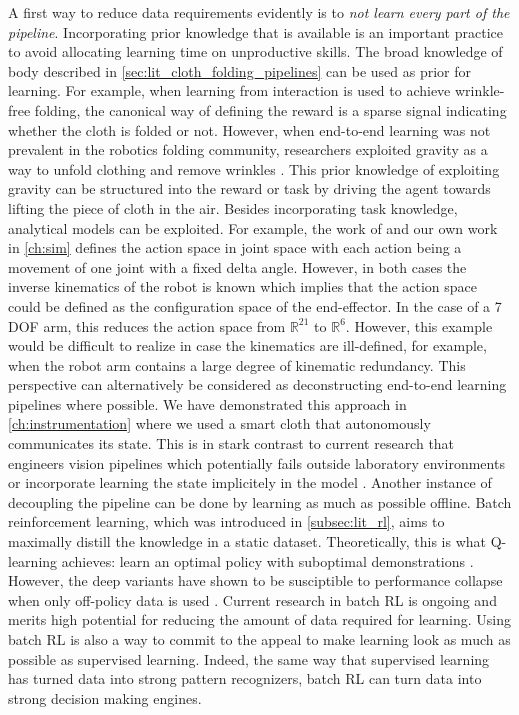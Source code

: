 \documentclass[\home/main.tex]{subfiles}
\begin{document}
A first way to reduce data requirements evidently is to \emph{not learn every part of the pipeline}. Incorporating prior knowledge that is available is an important practice to avoid allocating learning time on unproductive skills.
The broad knowledge of body described in \cref{sec:lit_cloth_folding_pipelines} can be used as prior for learning. For example, when learning from interaction is used to achieve wrinkle-free folding, the canonical way of defining the reward is a sparse signal indicating whether the cloth is folded or not. However, when end-to-end learning was not prevalent in the robotics folding community, researchers exploited gravity as a way to unfold clothing and remove wrinkles \autocite{Doumanoglou2016,Maitin2010}. This prior knowledge of exploiting gravity can be structured into the reward or task by driving the agent towards lifting the piece of cloth in the air.
Besides incorporating task knowledge, analytical models can be exploited. For example, the work of \textcite{Zhang2015} and our own work in \cref{ch:sim} defines the action space in joint space with each action being a movement of one joint with a fixed delta angle. However, in both cases the inverse kinematics of the robot is known which implies that the action space could be defined as the configuration space of the end-effector. In the case of a 7 \gls{DOF} arm, this reduces the action space from $\mathbb{R}^{21}$ to $\mathbb{R}^6$. However, this example would be difficult to realize in case the kinematics are ill-defined, for example, when the robot arm contains a large degree of kinematic redundancy. 
This perspective can alternatively be considered as deconstructing end-to-end learning pipelines where possible. We have demonstrated this approach in \cref{ch:instrumentation} where we used a smart cloth that autonomously communicates its state. This is in stark contrast to current research that engineers vision pipelines \autocite{Wu2020} which potentially fails outside laboratory environments or incorporate learning the state implicitely in the model \autocite{Matas2018}. 
Another instance of decoupling the pipeline can be done by learning as much as possible offline. Batch reinforcement learning, which was introduced in \cref{subsec:lit_rl}, aims to maximally distill the knowledge in a static dataset. Theoretically, this is what Q-learning achieves: learn an optimal policy with suboptimal demonstrations \autocite{Sutton2018}. However, the deep variants have shown to be susciptible to performance collapse when only off-policy data is used \autocite{hausknecht2016policy}. Current research in batch RL is ongoing and merits high potential for reducing the amount of data required for learning. Using batch RL is also a way to commit to the appeal to make learning look as much as possible as supervised learning. Indeed, the same way that supervised learning has turned data into strong pattern recognizers, batch RL can turn data into strong decision making engines. 
\end{document}
